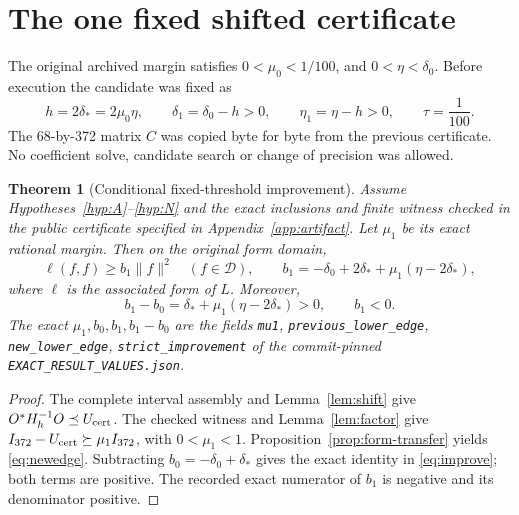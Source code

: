 \documentclass[11pt,a4paper]{article}
\newcommand{\DD}{\mathcal D}
\newcommand{\norm}[1]{\lVert #1\rVert}
\newtheorem{theorem}{Theorem}[section]
\theoremstyle{definition}
\theoremstyle{remark}
\numberwithin{equation}{section}
\begin{document}
\section{The one fixed shifted certificate}\label{sec:result}

The original archived margin satisfies \(0<\mu_0<1/100\), and
\(0<\eta<\delta_0\). Before execution the candidate was fixed as
\begin{equation}\label{eq:candidate}
 h=2\delta_*=2\mu_0\eta,\qquad
 \delta_1=\delta_0-h>0,\qquad \eta_1=\eta-h>0,\qquad \tau=\frac1{100}.
\end{equation}
The 68-by-372 matrix \(C\) was copied byte for byte from the previous
certificate. No coefficient solve, candidate search or change of precision
was allowed.

\begin{theorem}[Conditional fixed-threshold improvement]\label{thm:result}
Assume Hypotheses~\ref{hyp:A}--\ref{hyp:N} and the exact inclusions and
finite witness checked in the public certificate specified in
Appendix~\ref{app:artifact}. Let \(\mu_1\) be its exact rational margin.
Then on the original form domain,
\begin{equation}\label{eq:newedge}
 \ell(f,f)\ge b_1\norm{f}^2\quad(f\in\DD),\qquad
 b_1=-\delta_0+2\delta_*+\mu_1(\eta-2\delta_*),
\end{equation}
where \(\ell\) is the associated form of \(L\). Moreover,
\begin{equation}\label{eq:improve}
 b_1-b_0=\delta_*+\mu_1(\eta-2\delta_*)>0,\qquad b_1<0.
\end{equation}
The exact \(\mu_1,b_0,b_1,b_1-b_0\) are the fields
\texttt{mu1}, \texttt{previous\_lower\_edge},
\texttt{new\_lower\_edge}, \texttt{strict\_improvement}
of the commit-pinned \texttt{EXACT\_RESULT\_VALUES.json}.
\end{theorem}
\begin{proof}
The complete interval assembly and Lemma~\ref{lem:shift} give
\(O^*H_h^{-1}O\preceq U_{\rm cert}\).
The checked witness and Lemma~\ref{lem:factor} give
\(I_{372}-U_{\rm cert}\succeq\mu_1 I_{372}\), with
\(0<\mu_1<1\). Proposition~\ref{prop:form-transfer} yields
\eqref{eq:newedge}. Subtracting \(b_0=-\delta_0+\delta_*\)
gives the exact identity in \eqref{eq:improve}; both terms are positive.
The recorded exact numerator of \(b_1\) is negative and its denominator
positive.
\end{proof}
\end{document}
